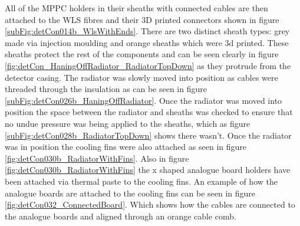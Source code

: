 


All of the MPPC holders in their sheaths with connected cables are then attached to the WLS fibres and their 3D printed connectors shown in figure \ref{subFig:detCon014b_WlsWithEnds}. There are two distinct sheath types: grey made via injection moulding and orange sheaths which were 3d printed. These sheaths protect the rest of the components and can be seen clearly in figure \ref{fig:detCon_HaningOffRadiator_RadiatorTopDown} as they protrude from the detector casing. The radiator was slowly moved into position as cables were threaded through the insulation as can be seen in figure \ref{subFig:detCon026b_HaningOffRadiator}. Once the radiator was moved into position the space between the radiator and sheaths was checked to ensure that no undue pressure was being applied to the sheaths, which as figure \ref{subFig:detCon028b_RadiatorTopDown} shows there wasn't. Once the radiator was in position the cooling fins were also attached as seen in figure \ref{fig:detCon030b_RadiatorWithFins}. Also in figure \ref{fig:detCon030b_RadiatorWithFins} the x shaped analogue board holders have been attached via thermal paste to the cooling fins. An example of how the analogue boards are attached to the cooling fins can be seen in figure \ref{fig:detCon032_ConnectedBoard}. Which shows how the cables are connected to the analogue boards and aligned through an orange cable comb. 

